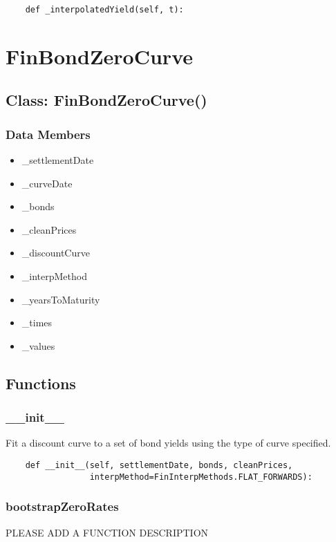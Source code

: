 \documentclass[twoside,11pt]{book}
\begin{document}
\begin{lstlisting}
    def _interpolatedYield(self, t):
\end{lstlisting}

\newpage
\section{FinBondZeroCurve}

\subsection*{Class: FinBondZeroCurve()}


\subsubsection*{Data Members}
\begin{itemize}
\item{\_settlementDate}
\item{\_curveDate}
\item{\_bonds}
\item{\_cleanPrices}
\item{\_discountCurve}
\item{\_interpMethod}
\item{\_yearsToMaturity}
\item{\_times}
\item{\_values}
\end{itemize}

\subsection*{Functions}

\subsubsection*{{\bf \_\_init\_\_}}
Fit a discount curve to a set of bond yields using the type of  curve specified.  

\begin{lstlisting}
    def __init__(self, settlementDate, bonds, cleanPrices,
                 interpMethod=FinInterpMethods.FLAT_FORWARDS):
\end{lstlisting}

\subsubsection*{{\bf bootstrapZeroRates}}
PLEASE ADD A FUNCTION DESCRIPTION
\end{document}
